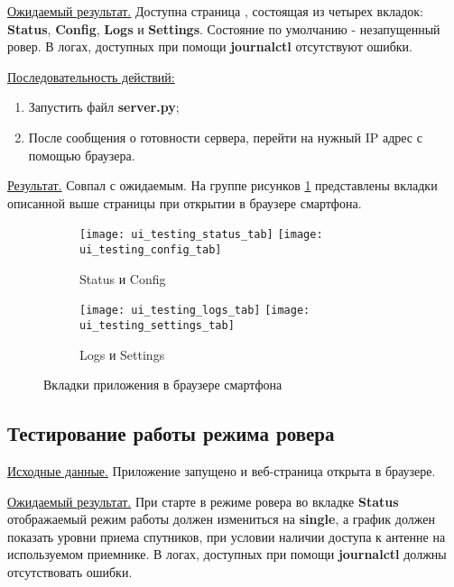 \underline{Ожидаемый результат.} Доступна страница , состоящая из четырех вкладок: \textbf{Status}, \textbf{Config}, \textbf{Logs} и \textbf{Settings}. Состояние по умолчанию - незапущенный ровер. В логах, доступных при помощи \textbf{journalctl} отсутствуют ошибки.

\underline{Последовательность действий:}

\begin{enumerate}
  \item Запустить файл \textbf{server.py};
  \item После сообщения о готовности сервера, перейти на нужный IP адрес с помощью браузера.
\end{enumerate}

\underline{Результат.} Совпал с ожидаемым. На группе рисунков \ref{img:alltabs2} представлены вкладки описанной выше страницы при открытии в браузере смартфона.

\begin{figure}
  \begin{subfigure}{\linewidth}
    \center
    \texttt{[image: ui\_testing\_status\_tab]}
    \texttt{[image: ui\_testing\_config\_tab]}
    \caption{Status и Config}
  \end{subfigure}\par\medskip
  \begin{subfigure}{\linewidth}
    \center
    \texttt{[image: ui\_testing\_logs\_tab]}
    \texttt{[image: ui\_testing\_settings\_tab]}
    \caption{Logs и Settings}
  \end{subfigure}\par\medskip
  \caption{Вкладки приложения в браузере смартфона}
  \label{img:alltabs2}
\end{figure}

\clearpage

\subsection{Тестирование работы режима ровера} \label{subsect4_2_2}

\underline{Исходные данные.} Приложение запущено и веб-страница открыта в браузере.

\underline{Ожидаемый результат.} При старте в режиме ровера во вкладке \textbf{Status} отображаемый режим работы должен измениться на \textbf{single}, а график должен показать уровни приема спутников, при условии наличии доступа к антенне на используемом приемнике. В логах, доступных при помощи \textbf{journalctl} должны отсутствовать ошибки.

